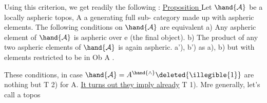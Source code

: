 Using this criterion, we get readily the following :
\uline{Proposition } Let $\hand{\mathcal{A}}$ be a locally aspheric topos, A a generating full sub-%
category made up with aspheric elements. The following conditions on $\hand{\mathcal{A}}$ are 
equivalent\hand{:} 
a) Any aspheric element of $\hand{\mathcal{A}}$ is aspheric over e (the final object).
b) The product of any two aspheric elements of $\hand{\mathcal{A}}$ is again aspheric.
a'), b') as a), b) but with elements restricted to be in Ob A .

These conditions, in case $\hand{\mathcal{A}} = A^{\hand{\wedge}}\deleted{\illegible{1}}$ are nothing but T 2) for A. \uline{It
turns out they imply already} T 1). Mre generally, let's call a topos
